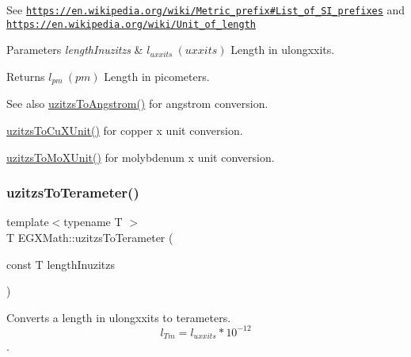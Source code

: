 See \href{https://en.wikipedia.org/wiki/Metric_prefix#List_of_SI_prefixes}{\tt https\+://en.\+wikipedia.\+org/wiki/\+Metric\+\_\+prefix\#\+List\+\_\+of\+\_\+\+S\+I\+\_\+prefixes} and \href{https://en.wikipedia.org/wiki/Unit_of_length}{\tt https\+://en.\+wikipedia.\+org/wiki/\+Unit\+\_\+of\+\_\+length} 
\begin{DoxyParams}{Parameters}
{\em length\+Inuzitzs} & $ l_{uxxits}\ (uxxits)$ Length in ulongxxits. \\
\hline
\end{DoxyParams}
\begin{DoxyReturn}{Returns}
$ l_{pm}\ (pm)$ Length in picometers. 
\end{DoxyReturn}
\begin{DoxySeeAlso}{See also}
\mbox{\hyperlink{group___e_g_x_math-_conversions-_length_conversions-uzitzs-_non-_s_i_gaaaecee65b1db5abcc71e18526e7073eb}{uzitzs\+To\+Angstrom()}} for angstrom conversion. 

\mbox{\hyperlink{group___e_g_x_math-_conversions-_length_conversions-uzitzs-_non-_s_i_gab25470e41b88c41d4bf32622baa6c472}{uzitzs\+To\+Cu\+X\+Unit()}} for copper x unit conversion. 

\mbox{\hyperlink{group___e_g_x_math-_conversions-_length_conversions-uzitzs-_non-_s_i_ga64b556911b0bb06cf315aa02f5e2d379}{uzitzs\+To\+Mo\+X\+Unit()}} for molybdenum x unit conversion. 
\end{DoxySeeAlso}
\mbox{\label{group___e_g_x_math-_conversions-_length_conversions-uzitzs-_s_i_gaed1a457a06ea3b69a4c63414b08b03a3}} 
\subsubsection{\texorpdfstring{uzitzs\+To\+Terameter()}{uzitzsToTerameter()}}
{\footnotesize\ttfamily template$<$typename T $>$ \\
T E\+G\+X\+Math\+::uzitzs\+To\+Terameter (\begin{DoxyParamCaption}\item[{const T}]{length\+Inuzitzs }\end{DoxyParamCaption})}



Converts a length in ulongxxits to terameters. \[ l_{Tm}=l_{uxxits} * 10^{-12} \]. 

